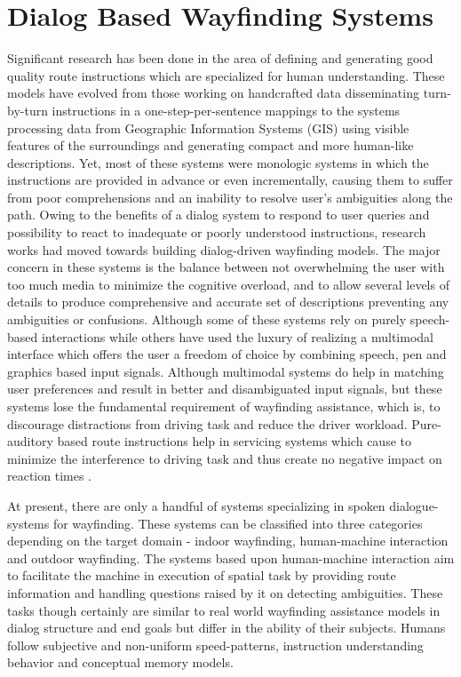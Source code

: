 \documentclass{iitkthesis}
\begin{document}
 \section{Dialog Based Wayfinding Systems} 
 Significant research has been done in the area of defining \cite{lovelace} and generating \cite{Dale,Habel,Maab,pattabhiraman} good quality route instructions which are specialized for human understanding. These models have evolved from those working on handcrafted data disseminating turn-by-turn instructions in a one-step-per-sentence mappings to the systems processing data from Geographic Information Systems (GIS) using visible features of the surroundings and generating compact and more human-like descriptions. Yet, most of these systems were monologic systems in which the instructions are provided in advance or even incrementally, causing them to suffer from poor comprehensions and an inability to resolve user's ambiguities along the path. Owing to the benefits of a dialog system to respond to user queries and possibility to react to inadequate or poorly understood instructions, research works \cite{hurtig, jokinen, richter} had moved towards building dialog-driven wayfinding models. The major concern in these systems is the balance between not overwhelming the user with too much media to minimize the cognitive overload, and to allow several levels of details to produce comprehensive and accurate set of descriptions preventing any ambiguities or confusions. Although some \cite{richter} of these systems rely on purely speech-based interactions while others \cite{hurtig,jokinen} have used the luxury of realizing a multimodal interface which offers the user a freedom of choice by combining speech, pen and graphics based input signals. Although multimodal systems do help in matching user preferences and result in better and disambiguated input signals, but these systems lose the fundamental requirement of wayfinding assistance, which is, to discourage distractions from driving task and reduce the driver workload. Pure-auditory based route instructions help in servicing systems which cause to minimize the interference to driving task and thus create no negative impact on reaction times \cite{srinivasaneffect}. 
 
At present, there are only a handful of systems specializing in spoken dialogue-systems for wayfinding. These systems can be classified into three categories depending on the target domain - indoor wayfinding, human-machine interaction and outdoor wayfinding. The systems \cite{fongsurvey} based upon human-machine interaction aim to facilitate the machine in execution of spatial task by providing route information and handling questions raised by it on detecting ambiguities. These tasks though certainly are similar to real world wayfinding assistance models in dialog structure and end goals but differ in the ability of their subjects. Humans follow subjective and non-uniform speed-patterns, instruction understanding behavior and conceptual memory models. 
\end{document}
